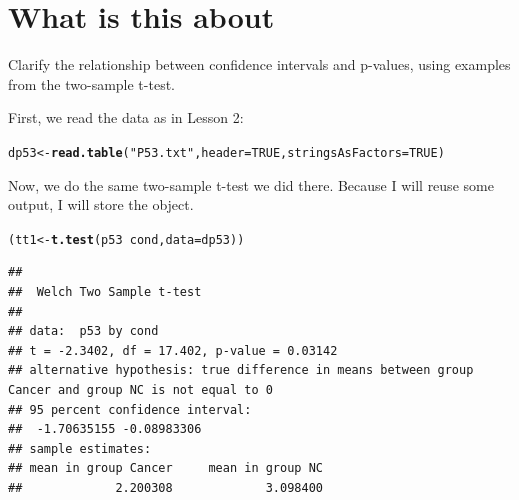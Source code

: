 \documentclass[a4paper,11pt]{article}\usepackage[]{graphicx}\usepackage[]{xcolor}
\makeatletter
\newcommand{\hlnum}[1]{\textcolor[rgb]{0.686,0.059,0.569}{#1}}%
\newcommand{\hlsng}[1]{\textcolor[rgb]{0.192,0.494,0.8}{#1}}%
\newcommand{\hlopt}[1]{\textcolor[rgb]{0,0,0}{#1}}%
\newcommand{\hldef}[1]{\textcolor[rgb]{0.345,0.345,0.345}{#1}}%
\newcommand{\hlkwb}[1]{\textcolor[rgb]{0.69,0.353,0.396}{#1}}%
\newcommand{\hlkwc}[1]{\textcolor[rgb]{0.333,0.667,0.333}{#1}}%
\newcommand{\hlkwd}[1]{\textcolor[rgb]{0.737,0.353,0.396}{\textbf{#1}}}%
\newenvironment{kframe}{%
 \def\at@end@of@kframe{}%
 \ifinner\ifhmode%
  \def\at@end@of@kframe{\end{minipage}}%
  \begin{minipage}{\columnwidth}%
 \fi\fi%
 \def\FrameCommand##1{\hskip\@totalleftmargin \hskip-\fboxsep
 \colorbox{shadecolor}{##1}\hskip-\fboxsep
     \hskip-\linewidth \hskip-\@totalleftmargin \hskip\columnwidth}%
 \MakeFramed {\advance\hsize-\width
   \@totalleftmargin\z@ \linewidth\hsize
   \@setminipage}}%
 {\par\unskip\endMakeFramed%
 \at@end@of@kframe}
\newenvironment{knitrout}{}{} %
\numberwithin{exercise}{section}
\makeatother
\begin{document}
\clearpage



\section{What is this about}
\label{sec:what-this-about}


Clarify the relationship between confidence intervals and p-values, using examples from the two-sample t-test.


First, we read the data as in Lesson 2:

\begin{knitrout}
\color{fgcolor}\begin{kframe}
\begin{alltt}
\hldef{dp53} \hlkwb{<-} \hlkwd{read.table}\hldef{(}\hlsng{"P53.txt"}\hldef{,} \hlkwc{header} \hldef{=} \hlnum{TRUE}\hldef{,} \hlkwc{stringsAsFactors} \hldef{=} \hlnum{TRUE}\hldef{)}
\end{alltt}
\end{kframe}
\end{knitrout}


Now, we do the same two-sample t-test we did there. Because I will reuse some output, I will store the object.

\begin{knitrout}
\color{fgcolor}\begin{kframe}
\begin{alltt}
\hldef{(tt1} \hlkwb{<-} \hlkwd{t.test}\hldef{(p53} \hlopt{~} \hldef{cond,} \hlkwc{data} \hldef{= dp53))}
\end{alltt}
\begin{verbatim}
## 
## 	Welch Two Sample t-test
## 
## data:  p53 by cond
## t = -2.3402, df = 17.402, p-value = 0.03142
## alternative hypothesis: true difference in means between group Cancer and group NC is not equal to 0
## 95 percent confidence interval:
##  -1.70635155 -0.08983306
## sample estimates:
## mean in group Cancer     mean in group NC 
##             2.200308             3.098400
\end{verbatim}
\end{kframe}
\end{knitrout}
\end{document}
